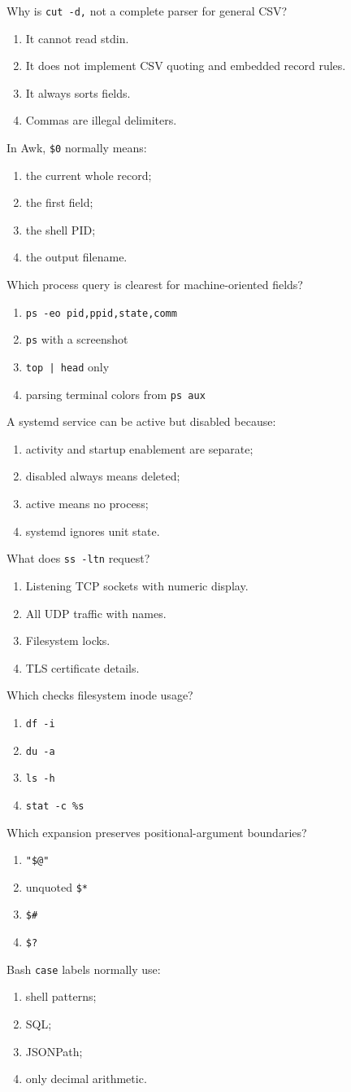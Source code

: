 \documentclass[11pt,oneside,openany]{book}
\newcommand{\fourchoices}[4]{%
  \begin{enumerate}[label=\Alph*),leftmargin=2em,itemsep=0.25em]
    \item #1
    \item #2
    \item #3
    \item #4
  \end{enumerate}}
\begin{document}
\begin{questionbox}[title={Medium 11 -- CSV caution}]
Why is \texttt{cut -d,} not a complete parser for general CSV?
\fourchoices{It cannot read stdin.}{It does not implement CSV quoting and embedded record rules.}{It always sorts fields.}{Commas are illegal delimiters.}
\end{questionbox}

\begin{questionbox}[title={Medium 12 -- Awk fields}]
In Awk, \texttt{\$0} normally means:
\fourchoices{the current whole record;}{the first field;}{the shell PID;}{the output filename.}
\end{questionbox}

\begin{questionbox}[title={Medium 13 -- Process scripting}]
Which process query is clearest for machine-oriented fields?
\fourchoices{\texttt{ps -eo pid,ppid,state,comm}}{\texttt{ps} with a screenshot}{\texttt{top | head} only}{parsing terminal colors from \texttt{ps aux}}
\end{questionbox}

\begin{questionbox}[title={Medium 14 -- Service dimensions}]
A systemd service can be active but disabled because:
\fourchoices{activity and startup enablement are separate;}{disabled always means deleted;}{active means no process;}{systemd ignores unit state.}
\end{questionbox}

\begin{questionbox}[title={Medium 15 -- Socket listing}]
What does \texttt{ss -ltn} request?
\fourchoices{Listening TCP sockets with numeric display.}{All UDP traffic with names.}{Filesystem locks.}{TLS certificate details.}
\end{questionbox}

\begin{questionbox}[title={Medium 16 -- Inode capacity}]
Which checks filesystem inode usage?
\fourchoices{\texttt{df -i}}{\texttt{du -a}}{\texttt{ls -h}}{\texttt{stat -c \%s}}
\end{questionbox}

\begin{questionbox}[title={Medium 17 -- Positional parameters}]
Which expansion preserves positional-argument boundaries?
\fourchoices{\texttt{"\$@"}}{unquoted \texttt{\$*}}{\texttt{\$\#}}{\texttt{\$?}}
\end{questionbox}

\begin{questionbox}[title={Medium 18 -- \texttt{case} language}]
Bash \texttt{case} labels normally use:
\fourchoices{shell patterns;}{SQL;}{JSONPath;}{only decimal arithmetic.}
\end{questionbox}
\end{document}
